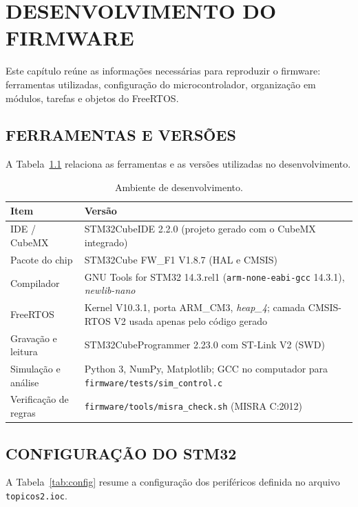 \chapter{DESENVOLVIMENTO DO FIRMWARE}\label{cap:desenvolvimento}

Este capítulo reúne as informações necessárias para reproduzir o firmware: ferramentas utilizadas, configuração do microcontrolador, organização em módulos, tarefas e objetos do FreeRTOS.

\section{FERRAMENTAS E VERSÕES}

A Tabela~\ref{tab:versoes} relaciona as ferramentas e as versões utilizadas no desenvolvimento.

\begin{table}[H]
\centering\caption{Ambiente de desenvolvimento.}\label{tab:versoes}
\begin{tabularx}{\textwidth}{lX}
\hline\textbf{Item} & \textbf{Versão}\\\hline
IDE / CubeMX & STM32CubeIDE 2.2.0 (projeto gerado com o CubeMX integrado)\\
Pacote do chip & STM32Cube FW\_F1 V1.8.7 (HAL e CMSIS)\\
Compilador & GNU Tools for STM32 14.3.rel1 (\texttt{arm-none-eabi-gcc} 14.3.1), \textit{newlib-nano}\\
FreeRTOS & Kernel V10.3.1, porta ARM\_CM3, \textit{heap\_4}; camada CMSIS-RTOS V2 usada apenas pelo código gerado\\
Gravação e leitura & STM32CubeProgrammer 2.23.0 com ST-Link V2 (SWD)\\
Simulação e análise & Python 3, NumPy, Matplotlib; GCC no computador para \texttt{firmware/tests/sim\_control.c}\\
Verificação de regras & \texttt{firmware/tools/misra\_check.sh} (MISRA C:2012)\\\hline
\end{tabularx}
\end{table}

\section{CONFIGURAÇÃO DO STM32}

A Tabela~\ref{tab:config} resume a configuração dos periféricos definida no arquivo \texttt{topicos2.ioc}.

